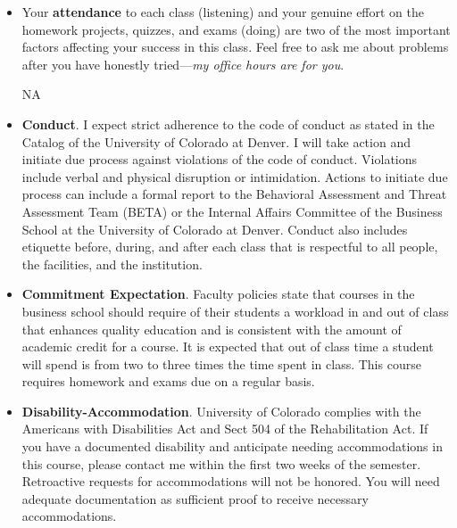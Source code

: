 \documentclass[11pt]{article}
\begin{document}
\begin{itemize}
\begin{itemize}
\item  Your \textbf{attendance} to each class
(listening) and your genuine effort on the homework projects,
quizzes, and exams (doing) are two of the most important factors
affecting your success in this class. Feel free to ask me about problems after you
have honestly tried---\emph{my office hours are for you}.

NA

\item \textbf{Conduct}. I expect strict adherence to the code of conduct as stated in the Catalog of the University of Colorado at Denver.  I will take action and initiate due process against violations of the code of conduct.  Violations include verbal and physical disruption or intimidation.  Actions to initiate due process can include a formal report to the Behavioral Assessment and Threat Assessment Team (BETA) or the Internal Affairs Committee of the Business School at the University of Colorado at Denver.  Conduct also includes etiquette before, during, and after each class that is respectful to all people, the facilities, and the institution.   

\item \textbf{Commitment Expectation}. Faculty policies state that courses in the business school should require of their students a workload in and out of class that enhances quality education and is consistent with the amount of academic credit for a course.  It is expected that out of class time a student will spend is from two to three times the time spent in class.  This course requires homework and exams due on a regular basis.  

\item \textbf{Disability-Accommodation}. University of Colorado complies with the
Americans with Disabilities Act and Sect 504 of the Rehabilitation
Act.  If you have a documented disability and anticipate needing
accommodations in this course, please contact me within the first
two weeks of the semester.  Retroactive requests for accommodations
will not be honored.  You will need adequate documentation as sufficient proof to receive necessary accommodations.
\end{itemize}
\end{itemize}

\end{document}

